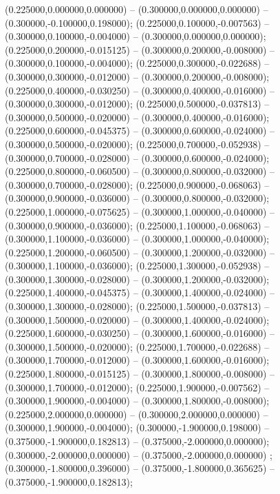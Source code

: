  (0.225000,0.000000,0.000000) -- (0.300000,0.000000,0.000000) -- (0.300000,-0.100000,0.198000);
 (0.225000,0.100000,-0.007563) -- (0.300000,0.100000,-0.004000) -- (0.300000,0.000000,0.000000);
 (0.225000,0.200000,-0.015125) -- (0.300000,0.200000,-0.008000) -- (0.300000,0.100000,-0.004000);
 (0.225000,0.300000,-0.022688) -- (0.300000,0.300000,-0.012000) -- (0.300000,0.200000,-0.008000);
 (0.225000,0.400000,-0.030250) -- (0.300000,0.400000,-0.016000) -- (0.300000,0.300000,-0.012000);
 (0.225000,0.500000,-0.037813) -- (0.300000,0.500000,-0.020000) -- (0.300000,0.400000,-0.016000);
 (0.225000,0.600000,-0.045375) -- (0.300000,0.600000,-0.024000) -- (0.300000,0.500000,-0.020000);
 (0.225000,0.700000,-0.052938) -- (0.300000,0.700000,-0.028000) -- (0.300000,0.600000,-0.024000);
 (0.225000,0.800000,-0.060500) -- (0.300000,0.800000,-0.032000) -- (0.300000,0.700000,-0.028000);
 (0.225000,0.900000,-0.068063) -- (0.300000,0.900000,-0.036000) -- (0.300000,0.800000,-0.032000);
 (0.225000,1.000000,-0.075625) -- (0.300000,1.000000,-0.040000) -- (0.300000,0.900000,-0.036000);
 (0.225000,1.100000,-0.068063) -- (0.300000,1.100000,-0.036000) -- (0.300000,1.000000,-0.040000);
 (0.225000,1.200000,-0.060500) -- (0.300000,1.200000,-0.032000) -- (0.300000,1.100000,-0.036000);
 (0.225000,1.300000,-0.052938) -- (0.300000,1.300000,-0.028000) -- (0.300000,1.200000,-0.032000);
 (0.225000,1.400000,-0.045375) -- (0.300000,1.400000,-0.024000) -- (0.300000,1.300000,-0.028000);
 (0.225000,1.500000,-0.037813) -- (0.300000,1.500000,-0.020000) -- (0.300000,1.400000,-0.024000);
 (0.225000,1.600000,-0.030250) -- (0.300000,1.600000,-0.016000) -- (0.300000,1.500000,-0.020000);
 (0.225000,1.700000,-0.022688) -- (0.300000,1.700000,-0.012000) -- (0.300000,1.600000,-0.016000);
 (0.225000,1.800000,-0.015125) -- (0.300000,1.800000,-0.008000) -- (0.300000,1.700000,-0.012000);
 (0.225000,1.900000,-0.007562) -- (0.300000,1.900000,-0.004000) -- (0.300000,1.800000,-0.008000);
 (0.225000,2.000000,0.000000) -- (0.300000,2.000000,0.000000) -- (0.300000,1.900000,-0.004000);
 (0.300000,-1.900000,0.198000) -- (0.375000,-1.900000,0.182813) -- (0.375000,-2.000000,0.000000);
 (0.300000,-2.000000,0.000000) -- (0.375000,-2.000000,0.000000) ;
 (0.300000,-1.800000,0.396000) -- (0.375000,-1.800000,0.365625) -- (0.375000,-1.900000,0.182813);
